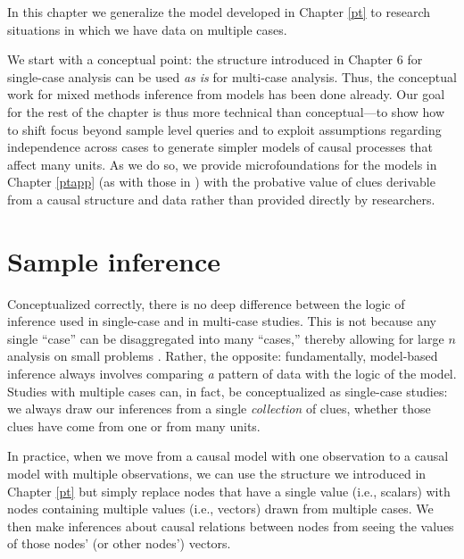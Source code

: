 \documentclass[
  12pt,
]{book}
\begin{document}
In this chapter we generalize the model developed in Chapter \ref{pt} to research situations in which we have data on multiple cases.

We start with a conceptual point: the structure introduced in Chapter 6 for single-case analysis can be used \emph{as is} for multi-case analysis. Thus, the conceptual work for mixed methods inference from models has been done already. Our goal for the rest of the chapter is thus more technical than conceptual---to show how to shift focus beyond sample level queries and to exploit assumptions regarding independence across cases to generate simpler models of causal processes that affect many units. As we do so, we provide microfoundations for the models in Chapter \ref{ptapp} (as with those in \citet{humphreys2015mixing}) with the probative value of clues derivable from a causal structure and data rather than provided directly by researchers.

\hypertarget{sample-inference}{%
\section{Sample inference}\label{sample-inference}}

Conceptualized correctly, there is no deep difference between the logic of inference used in single-case and in multi-case studies. This is not because any single ``case'' can be disaggregated into many ``cases,'' thereby allowing for large \(n\) analysis on small problems \citep{king1994designing}. Rather, the opposite: fundamentally, model-based inference always involves comparing \emph{a} pattern of data with the logic of the model. Studies with multiple cases can, in fact, be conceptualized as single-case studies: we always draw our inferences from a single \emph{collection} of clues, whether those clues have come from one or from many units.

In practice, when we move from a causal model with one observation to a causal model with multiple observations, we can use the structure we introduced in Chapter \ref{pt} but simply replace nodes that have a single value (i.e., scalars) with nodes containing multiple values (i.e., vectors) drawn from multiple cases. We then make inferences about causal relations between nodes from seeing the values of those nodes' (or other nodes') vectors.
\end{document}
